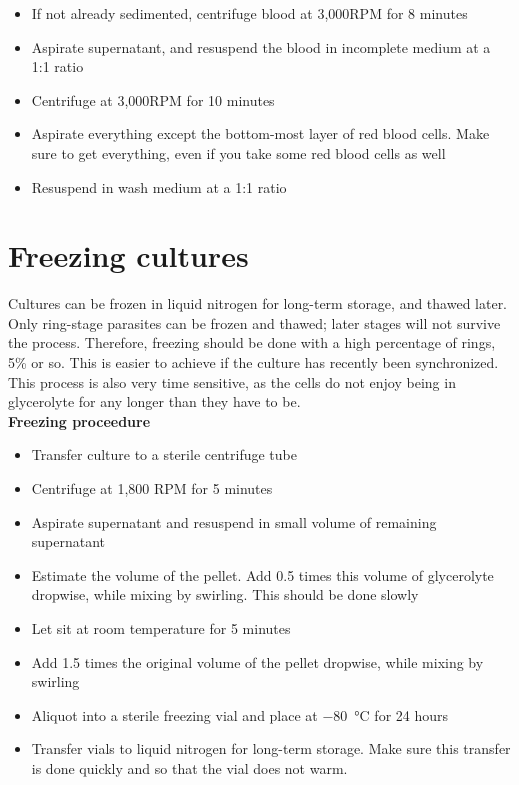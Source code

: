\documentclass{article}
\begin{document}
\begin{itemize}
	\item If not already sedimented, centrifuge blood at 3,000RPM for 8 minutes
	\item Aspirate supernatant, and resuspend the blood in incomplete medium at a 1:1 ratio
	\item Centrifuge at 3,000RPM for 10 minutes
	\item Aspirate everything except the bottom-most layer of red blood cells. Make sure to get everything, even if you take some red blood cells as well
	\item Resuspend in wash medium at a 1:1 ratio
\end{itemize}

\newpage

\section{Freezing cultures}

Cultures can be frozen in liquid nitrogen for long-term storage, and thawed later.\\

Only ring-stage parasites can be frozen and thawed; later stages will not survive the process. Therefore, freezing should be done with a high percentage of rings, 5\% or so. This is easier to achieve if the culture has recently been synchronized.\\

This process is also very time sensitive, as the cells do not enjoy being in glycerolyte for any longer than they have to be.\\

\textbf{Freezing proceedure}

\begin{itemize}
	\item Transfer culture to a sterile centrifuge tube
	\item Centrifuge at 1,800 RPM for 5 minutes
	\item Aspirate supernatant and resuspend in small volume of remaining supernatant
	\item Estimate the volume of the pellet. Add 0.5 times this volume of glycerolyte dropwise, while mixing by swirling. This should be done slowly
	\item Let sit at room temperature for 5 minutes
	\item Add 1.5 times the original volume of the pellet dropwise, while mixing by swirling
	\item Aliquot into a sterile freezing vial and place at \SI{-80}{\celsius} for 24 hours
	\item Transfer vials to liquid nitrogen for long-term storage. Make sure this transfer is done quickly and so that the vial does not warm.
\end{itemize}
\end{document}
